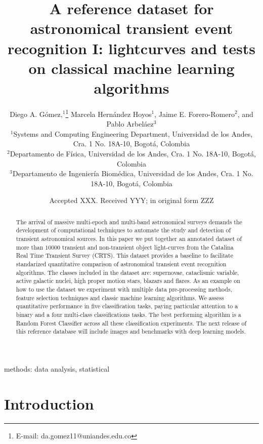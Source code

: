\documentclass[a4paper,fleqn,usenatbib]{mnras}
\title[A reference transient dataset I: lightcurves]{A reference
  dataset for astronomical transient event recognition I: lightcurves
  and tests on classical machine learning algorithms}
\author[Diego. A. G\'omez et al.]{
{Diego A. G\'omez,$^{1}$\thanks{E-mail: da.gomez11@uniandes.edu.co}}
Marcela Hern\'andez Hoyos$^{1}$,   
Jaime E. Forero-Romero$^{2}$,
\newauthor
and Pablo Arbel\'aez$^{3}$
\\
$^{1}$Systems and Computing Engineering Department, Universidad de los Andes, Cra. 1 No. 18A-10, Bogot\'a, Colombia\\
$^{2}$Departamento de F\'isica, Universidad de los Andes, Cra. 1 No. 18A-10, Bogot\'a, Colombia\\
$^{3}$Departamento de Ingenier\'ia Biom\'edica, Universidad de los Andes, Cra. 1 No. 18A-10, Bogot\'a, Colombia
}
\date{Accepted XXX. Received YYY; in original form ZZZ}
\begin{document}
\label{firstpage}
\pagerange{\pageref{firstpage}--\pageref{lastpage}}
\maketitle

\begin{abstract}

The arrival of massive multi-epoch and multi-band astronomical surveys
demands the development of computational techniques to automate the
study and detection of transient astronomical sources. 
In this paper we put together an annotated dataset of more than
$10000$ transient and non-transient object light-curves from the Catalina Real
Time Transient Survey (CRTS).
This dataset provides a baseline to facilitate standarized
quantitative comparison of astronomical transient event recognition
algorithms.   
The classes included in the dataset are: supernovae, cataclismic
variable, active galactic nuclei, high proper motion stars, blazars
and flares.
As an example on how to use the dataset we experiment with multiple data pre-processing methods,
feature selection techniques and classic machine learning algorithms. 
We assess quantitative performance in five classification tasks, paying particular
attention to a binary and a four multi-class classifications tasks.  
The best performing algorithm is a Random Forest Classifier across all
these classification experiments. 
The next release of this reference database will include images and
benchmarks with deep learning models.
\end{abstract}

\begin{keywords}
methods: data analysis, statistical
\end{keywords}



\section{Introduction}
\end{document}
